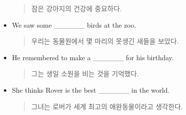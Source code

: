 \documentclass{article}
\begin{document}
\begin{addmargin}[1em]{1em}
\begin{itemize}
    \begin{quote}
    잠은 강아지의 건강에 중요하다.
    \end{quote}
    \item We saw some \_\_\_\_\_\_ birds at the zoo.
    \begin{quote}
    우리는 동물원에서 몇 마리의 못생긴 새들을 보았다.
    \end{quote}
    \item He remembered to make a \_\_\_\_\_\_ for his birthday.
    \begin{quote}
    그는 생일 소원을 비는 것을 기억했다.
    \end{quote}
    \item She thinks Rover is the best \_\_\_\_\_\_ in the world.
    \begin{quote}
    그녀는 로버가 세계 최고의 애완동물이라고 생각한다.
    \end{quote}
\end{itemize}
\end{addmargin}
\end{document}
